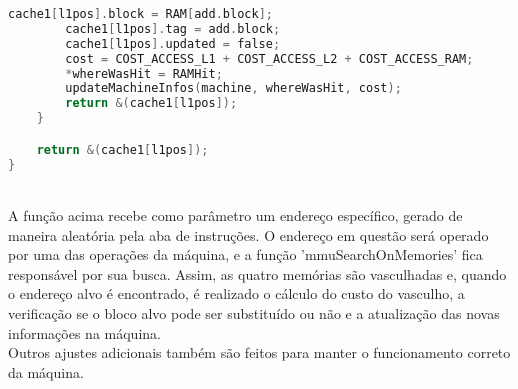 \documentclass{article}
\begin{document}
\begin{lstlisting}[caption={Exemplo da função MMUSearchOnMemorys.},label={lst:cod1},language=C]
        cache1[l1pos].block = RAM[add.block];
        cache1[l1pos].tag = add.block;
        cache1[l1pos].updated = false;
        cost = COST_ACCESS_L1 + COST_ACCESS_L2 + COST_ACCESS_RAM;
        *whereWasHit = RAMHit;
        updateMachineInfos(machine, whereWasHit, cost);
        return &(cache1[l1pos]);
    }

    return &(cache1[l1pos]);
}
\end{lstlisting}
\\ A função acima recebe como parâmetro um endereço específico, gerado de maneira aleatória pela aba de instruções. O endereço em questão será operado por uma das operações da máquina, e a função 'mmuSearchOnMemories' fica responsável por sua busca. Assim, as quatro memórias são vasculhadas e, quando o endereço alvo é encontrado, é realizado o cálculo do custo do vasculho, a verificação se o bloco alvo pode ser substituído ou não e a atualização das novas informações na máquina.
\\Outros ajustes adicionais também são feitos para manter o funcionamento correto da máquina.
\clearpage
\end{document}
